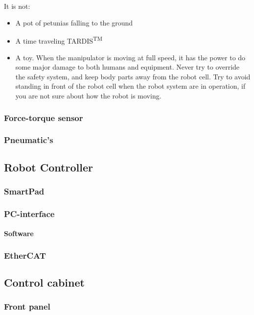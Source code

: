 \documentclass{article}
\begin{document}
    \\\\
    It is not:
    \begin{itemize}
        \item A pot of petunias falling to the ground
        \item A time traveling  TARDIS\textsuperscript{TM}
        \item A toy. When the manipulator is moving at full speed, it has the power to do some major damage to both humans and equipment. Never try to override the safety system, and keep body parts away from the robot cell. Try to avoid standing in front of the robot cell when the robot system are in operation, if you are not sure about how the robot is moving. 
    \end{itemize}
   
    
        \subsubsection{Force-torque sensor}
        \subsubsection{Pneumatic's}

    \subsection{Robot Controller}
        \subsubsection{SmartPad}
        \subsubsection{PC-interface}
        \paragraph{Software}
        \subsubsection{EtherCAT}
        


    \subsection{Control cabinet}
        \subsubsection{Front panel}
\end{document}
